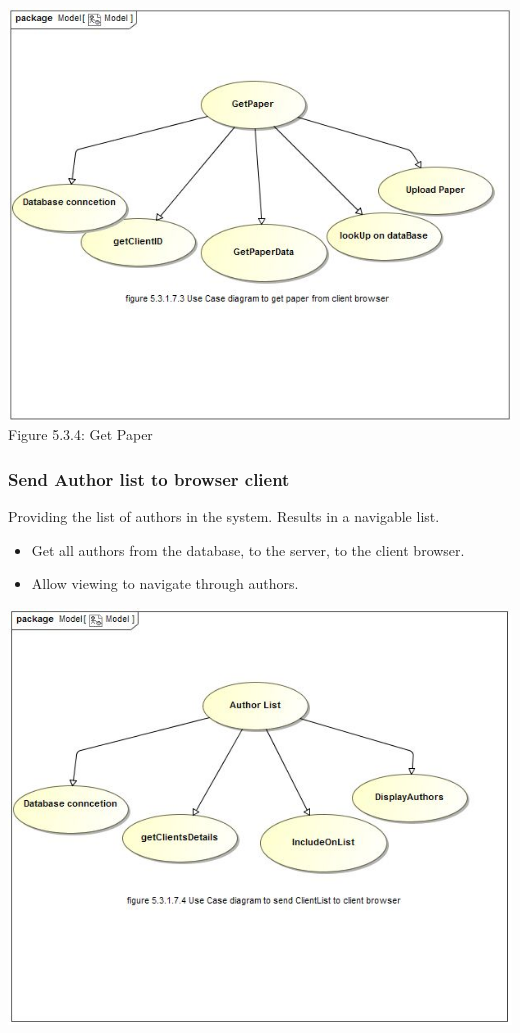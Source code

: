 \documentclass[hidelinks,a4paper,12pt]{article}
\begin{document}
		\includegraphics[width=1\textwidth]{./Graphs/UseCaseforGetpaper.JPG}\\[0.4cm]
		Figure 5.3.4: Get Paper
	
	\subsubsection{Send Author list to browser client}
	
	Providing the list of authors in the system. Results in a navigable
	list.		
	
	\begin{itemize}
		\item Get all authors from the database, to the server, to the client browser.
		\item Allow viewing to navigate through authors.
	\end{itemize}
	
	\includegraphics[width=1\textwidth]{./Graphs/UseCaseforAuthorList.JPG}\\[0.4cm]
	
\end{document}
